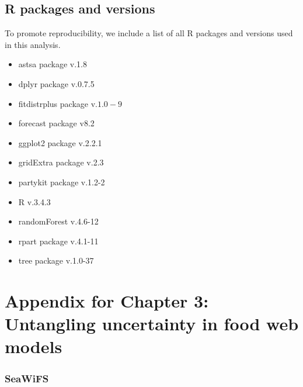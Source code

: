 \documentclass[oneside,12pt,final]{sty/ucthesis-CA2012}
\let\cite\citep                             %
\begin{document}
\begin{mainmatter}
\section{R packages and versions}
To promote reproducibility, we include a list of all R packages and versions used in this analysis.

\begin{itemize}
\item astsa package v.1.8 \cite{astsa}
\item dplyr package v.0.7.5 \cite{wickham2015dplyr}
\item fitdistrplus package v.$1.0-9$ \cite{fitdistrplus}
\item forecast package v8.2 \cite{forecast1, forecast2} 
\item ggplot2 package v.2.2.1 \cite{ggplot}
\item gridExtra package v.2.3 \cite{gridextra}
\item partykit package v.1.2-2 \cite{hothorn2015partykit}
\item R v.3.4.3 \cite{Rcite} 
\item randomForest v.4.6-12 \cite{liaw2016classification}
\item rpart package v.4.1-11 \cite{therneau2015rpart}
\item tree package v.1.0-37 \cite{ripley2016tree}
\end{itemize}


\chapter{Appendix for Chapter 3: Untangling uncertainty in food web models}{\label{appendix:b}}

\subsection{SeaWiFS}

\end{mainmatter}
\end{document}
